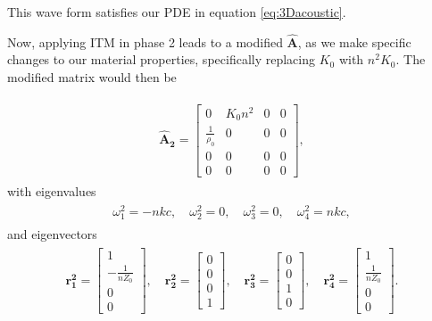 This wave form satisfies our \ac{PDE} in equation \ref{eq:3Dacoustic}.

Now, applying ITM in phase 2 leads to a modified $\mathbf{\hat{A}}$, as we make specific changes to our material properties, specifically replacing $K_0$ with $n^2K_0$. The modified matrix would then be

\begin{align}
    \begin{split}
    \mathbf{\hat{A}_2} = \begin{bmatrix}
        0 & K_{0} n^{2} & 0 & 0 \\
\frac{1}{\rho_{0}} & 0 & 0 & 0 \\
0 & 0 & 0 & 0 \\
0 & 0 & 0 & 0
    \end{bmatrix},
    \end{split}
\end{align}
with eigenvalues
\begin{align}
    \begin{split}
    \omega_1^2 = -n k c, \quad
    \omega_2^2 = 0, \quad
    \omega_3^2 = 0, \quad
    \omega_4^2 = n k c,
\end{split}
\end{align}
and eigenvectors
\begin{align}
    \begin{split}
    \mathbf{r_1^2} = \begin{bmatrix}
        1 \\
-\frac{1}{n Z_0} \\
0 \\
0
        \end{bmatrix}, \quad
        \mathbf{r_2^2} = \begin{bmatrix}
            0 \\
0 \\
0 \\
1
            \end{bmatrix}, \quad
            \mathbf{r_3^2} = \begin{bmatrix}
                0 \\
                0 \\
                1 \\
                0
                \end{bmatrix}, \quad
                \mathbf{r_4^2} = \begin{bmatrix}
                    1 \\
                    \frac{1}{n Z_0} \\
                    0 \\
                    0                    
                \end{bmatrix}.
    \end{split}
\end{align}

